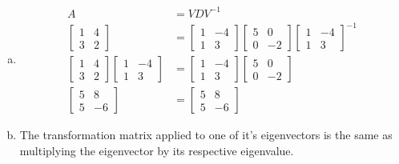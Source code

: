 \documentclass[12pt]{article}
\begin{document}
\begin{enumerate}[(a)]
	\item 
		\begin{align*}
		A &= VDV^{-1}\\
		\begin{bmatrix}
			1 & 4 \\
			3 & 2
		\end{bmatrix}
			&=
			\begin{bmatrix}
				1 & -4\\
				1 & 3
			\end{bmatrix}
			\begin{bmatrix}
				5 & 0\\
				0 & -2
			\end{bmatrix}
			\begin{bmatrix}
				1 & -4\\
				1 & 3
			\end{bmatrix}^{-1}\\
		\begin{bmatrix}
			1 & 4 \\
			3 & 2
		\end{bmatrix}
			\begin{bmatrix}
				1 & -4\\
				1 & 3
			\end{bmatrix}
			&=
			\begin{bmatrix}
				1 & -4\\
				1 & 3
			\end{bmatrix}
			\begin{bmatrix}
				5 & 0\\
				0 & -2
			\end{bmatrix}\\
		\begin{bmatrix}
			5 & 8\\
			5 & -6
		\end{bmatrix}
			&= \begin{bmatrix}
				5 & 8\\
				5 & -6
			\end{bmatrix}
		\end{align*}
	
	\item The transformation matrix applied to one of it's eigenvectors is the same as multiplying the eigenvector by its respective eigenvalue.
	

\end{enumerate}
\end{document}
